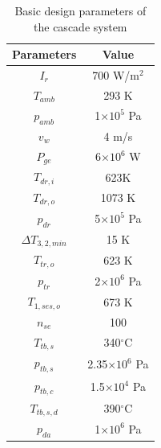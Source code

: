 \documentclass{article}
\begin{document}
\begin{table}[htbp]
	\caption{Basic design parameters of the cascade system}
	\begin{center}
	\begin{tabular}{cc}
		\toprule
		Parameters			&	Value\\
		\midrule
		$I_r$				&	700 W/m$^2$\\
		$T_{amb}$			&	293 K\\
		$p_{amb}$			&	1$\times10^5$ Pa\\
		$v_w$			&	4 m/s\\
		$P_{ge}$			&	6$\times10^6$ W\\
		$T_{dr,i}$			&	623K\\
		$T_{dr,o}$			&	1073 K\\
		$p_{dr}$			&	5$\times10^5$ Pa\\
		$\Delta{}T_{3,2,min}$	&	15 K \\
		$T_{tr,o}$			&	623 K\\
		$p_{tr}$			&	2$\times10^6$ Pa\\
		$T_{1,ses,o}$		&	673 K\\
		$n_{se}$			&	100\\
		$T_{tb,s}$			&	340$^\circ$C\\
		$p_{tb,s}$			&	2.35$\times10^6$ Pa\\
		$p_{tb,c}$			&	1.5$\times10^4$ Pa\\
		$T_{tb,s,d}$		&	390$^\circ$C\\
		$p_{da}$ 			& 	1$\times10^6$ Pa\\
		\bottomrule
	\end{tabular}
	\end{center}
	\label{tab:system-data}
\end{table}
\end{document}
